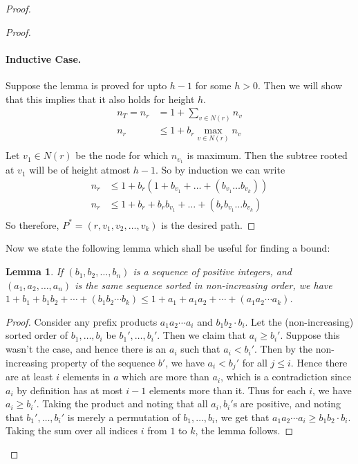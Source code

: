 \documentclass[answers]{exam}
\newtheorem{lemma}{Lemma}
\begin{document}
\begin{questions}
\begin{solution}
\begin{proof}
\begin{proof}
\paragraph{Inductive Case.} Suppose the lemma is proved for upto $h-1$ for some $h > 0$. Then we will show that this implies that it also holds for height $h$.
\begin{align*}
    n_T = n_r &= 1 + \sum_{v \in N(r)} n_v \\
    n_r &\leq 1 + b_r \max_{v \in N(r)} n_v \\
\end{align*}
Let $v_1 \in N(r)$ be the node for which $n_{v_1}$ is maximum. Then the subtree rooted at $v_1$ will be of height atmost $h-1$. So by induction we can write
\begin{align*}
    n_r &\leq 1 + b_r (1 + b_{v_1} + \ldots + (b_{v_1} \ldots b_{v_k})) \\
    n_r &\leq 1 + b_r +  b_r b_{v_1} + \ldots + (b_r b_{v_1} \ldots b_{v_k})\\
\end{align*}
So therefore, $P^* = (r, v_1, v_2, \ldots, v_k)$ is the desired path.
\end{proof}

Now we state the following lemma which shall be useful for finding a bound:

\begin{lemma}
If $(b_1, b_2, \ldots, b_n)$ is a sequence of positive integers, and $(a_1, a_2, \ldots, a_n)$ is the same sequence sorted in non-increasing order, we have $1 + b_1 + b_1 b_2 + \cdots + (b_1 b_2 \cdots b_k) \le 1 + a_1 + a_1 a_2 + \cdots + (a_1 a_2 \cdots a_k)$.
\end{lemma}

\begin{proof}
    Consider any prefix products $a_1 a_2 \cdots a_i$ and $b_1 b_2 \cdot b_i$. Let the (non-increasing) sorted order of $b_1, \ldots, b_i$ be $b_1', \ldots, b_i'$. Then we claim that $a_i \ge b_i'$. Suppose this wasn't the case, and hence there is an $a_i$ such that $a_i < b_i'$. Then by the non-increasing property of the sequence $b'$, we have $a_i < b_j'$ for all $j \le i$. Hence there are at least $i$ elements in $a$ which are more than $a_i$, which is a contradiction since $a_i$ by definition has at most $i - 1$ elements more than it. Thus for each $i$, we have $a_i \ge b_i'$. Taking the product and noting that all $a_i, b_i'$s are positive, and noting that $b_1', \ldots, b_i'$ is merely a permutation of $b_1, \ldots, b_i$, we get that $a_1 a_2 \cdots a_i \ge b_1 b_2 \cdot b_i$. Taking the sum over all indices $i$ from $1$ to $k$, the lemma follows.
\end{proof}


\end{proof}
\end{solution}
\end{questions}
\end{document}
